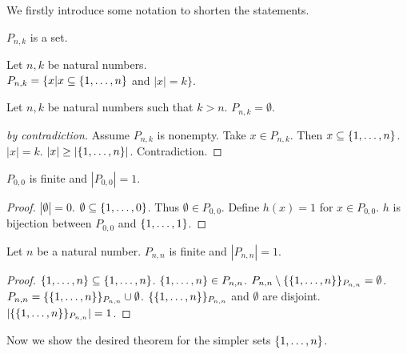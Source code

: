 \documentclass{article}
\begin{document}
We firstly introduce some notation to shorten the statements.
\begin{forthel}

\begin{signature}
$P_{n,k}$ is a set.
\end{signature}

\begin{axiom}
Let $n,k$ be natural numbers. \\
$P_{n,k} = \{ x | x \subseteq \{1,\dots,n\}$ and $|x|=k \}$.
\end{axiom}

\begin{lemma}
Let $n,k$ be natural numbers such that $k>n$.
$P_{n,k} = \emptyset$.
\end{lemma}
\begin{proof}[by contradiction]
Assume $P_{n,k}$ is nonempty.
Take $x \in P_{n,k}$.
Then $x \subseteq \{1,\dots,n\}$.
$|x|=k$.
$|x| \geq |\{1,\dots,n\}|$. Contradiction.
\end{proof}

\begin{lemma}
$P_{0,0}$ is finite and $|P_{0,0}|=1$.
\end{lemma}
\begin{proof}
$|\emptyset|=0$.
$\emptyset \subseteq \{1,\dots,0\}$.
Thus $\emptyset \in P_{0,0}$.
Define $h(x)=1$ for $x \in P_{0,0}$.
$h$ is bijection between $P_{0,0}$ and $\{1,\dots,1\}$.
\end{proof}

\begin{lemma}
Let $n$ be a natural number.
$P_{n,n}$ is finite and $|P_{n,n}|=1$.
\end{lemma}
\begin{proof}
$\{1,\dots,n\} \subseteq \{1,\dots,n\}$.
$\{1,\dots,n\} \in P_{n,n}$.
$P_{n,n} \setminus \{\{1,\dots,n\}\}_{P_{n,n}} = \emptyset$.
$P_{n,n} = \{\{1,\dots,n\}\}_{P_{n,n}} \cup \emptyset$.
$\{\{1,\dots,n\}\}_{P_{n,n}}$ and $\emptyset$ are disjoint.\\
$|\{\{1,\dots,n\}\}_{P_{n,n}}|=1$.
\end{proof}

\end{forthel}
%
Now we show the desired theorem for the simpler sets $\{1,\dots,n\}$.
%
\end{document}
